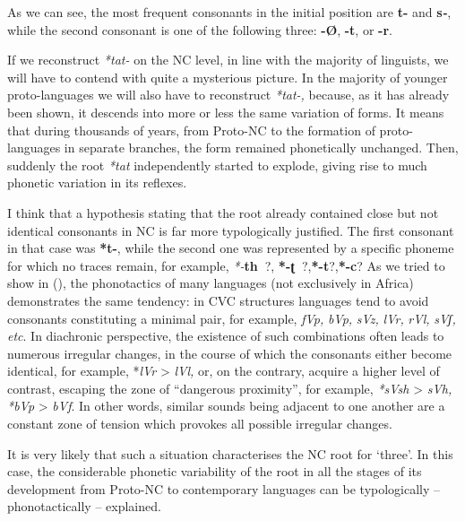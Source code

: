 As we can see, the most frequent consonants in the initial position are \textbf{t-} and \textbf{s\textit{-}}, while the second consonant is one of the following three: \textbf{-Ø}, \textbf{-t}, or \textbf{-r}.

\largerpage
If we reconstruct \textit{*tat-} on the NC level, in line with the majority of linguists, we will have to contend with quite a mysterious picture. In the majority of younger proto-languages we will also have to reconstruct \textit{*tat-,} because, as it has already been shown, it descends into more or less the same variation of forms. It means that during thousands of years, from Proto-NC to the formation of proto-languages in separate branches, the form remained phonetically unchanged. Then, suddenly the root \textit{*tat} independently started to explode, giving rise to much phonetic variation in its reflexes. 

I think that a hypothesis stating that the root already contained close but not identical consonants in NC is far more typologically justified. The first consonant in that case was \textbf{*t-}, while the second one was represented by a specific phoneme for which no traces remain, for example, \textit{*-}\textbf{th~}?, \textbf{*-ʈ~}?,\textbf{*-t{}}?,\textbf{*-c}? As we tried to show in (\citealt{PozdniakovSegerer2007}), the phonotactics of many languages (not exclusively in Africa) demonstrates the same tendency: in CVC structures languages tend to avoid consonants constituting a minimal pair, for example, \textit{fVp,} \textit{bVp,} \textit{sVz,} \textit{lVr,} \textit{rVl,} \textit{sVʃ,} \textit{etc}.  In diachronic perspective, the existence of such combinations often leads to numerous irregular changes, in the course of which the consonants either become identical, for example, *\textit{lVr} > \textit{lVl,} or, on the contrary, acquire a higher level of contrast, escaping the zone of “dangerous proximity”, for example, \textit{*sVsh} > \textit{sVh,} \textit{*bVp} > \textit{bVf}. In other words, similar sounds being adjacent to one another are a constant zone of tension which provokes all possible irregular changes.

It is very likely that such a situation characterises the NC root for ‘three’. In this case, the considerable phonetic variability of the root in all the stages of its development from Proto-NC to contemporary languages can be typologically – phonotactically – explained.

\largerpage
